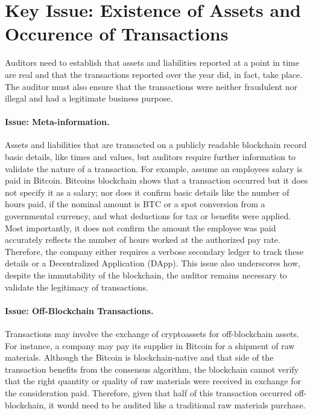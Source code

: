 \section{Key Issue: Existence of Assets and Occurence of Transactions}

Auditors need to establish that assets and liabilities reported at a point in time are real and that the transactions reported over the year did, in fact, take place. The auditor must also ensure that the transactions were neither fraudulent nor illegal and had a legitimate business purpose.  

\paragraph{Issue: Meta-information.} Assets and liabilities that are transacted on a publicly readable blockchain record basic details, like times and values, but auditors require further information to validate the nature of a transaction. For example, assume an employee\textquotesingle s salary is paid in Bitcoin. Bitcoin\textquotesingle s blockchain shows that a transaction occurred but it does not specify it as a salary; nor does it confirm basic details like the number of hours paid, if the nominal amount is BTC or a spot conversion from a governmental currency, and what deductions for tax or benefits were applied. Most importantly, it does not confirm the amount the employee was paid accurately reflects the number of hours worked at the authorized pay rate. Therefore, the company either requires a verbose secondary ledger to track these details or a Decentralized Application (DApp). This issue also underscores how, despite the immutability of the blockchain, the auditor remains necessary to validate the legitimacy of transactions.

\paragraph{Issue: Off-Blockchain Transactions.} Transactions may involve the exchange of cryptoassets for off-blockchain assets. For instance, a company may pay its supplier in Bitcoin for a shipment of raw materials. Although the Bitcoin is blockchain-native and that side of the transaction benefits from the consensus algorithm, the blockchain cannot verify that the right quantity or quality of raw materials were received in exchange for the consideration paid. Therefore, given that half of this transaction occurred off-blockchain, it would need to be audited like a traditional raw materials purchase. 

